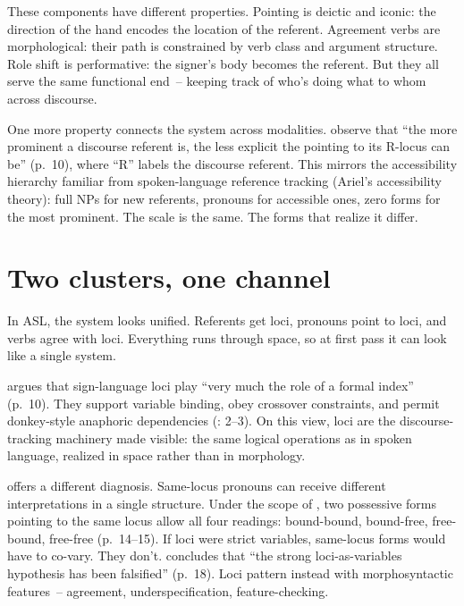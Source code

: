 These components have different properties. Pointing is deictic and iconic: the direction of the hand encodes the location of the referent. Agreement verbs are morphological: their path is constrained by verb class and argument structure. Role shift is performative: the signer's body becomes the referent. But they all serve the same functional end~-- keeping track of who's doing what to whom across discourse.

One more property connects the system across modalities. \textcite{steinbach2016} observe that \enquote{the more prominent a discourse referent is, the less explicit the pointing to its R-locus can be} (p.~10), where \enquote{R} labels the discourse referent. This mirrors the accessibility hierarchy familiar from spoken-language reference tracking (\eg Ariel's accessibility theory): full NPs for new referents, pronouns for accessible ones, zero forms for the most prominent. The scale is the same. The forms that realize it differ.


\section{Two clusters, one channel}
\label{sec:sign:two-clusters}

In ASL, the system looks unified. Referents get loci, pronouns point to loci, and verbs agree with loci. Everything runs through space, so at first pass it can look like a single system.

\textcite{schlenker2017} argues that sign-language loci play \enquote{very much the role of a formal index} (p.~10). They support variable binding, obey crossover constraints, and permit donkey-style anaphoric dependencies (\citealt{zucchi2012}: 2--3). On this view, loci are the discourse-tracking machinery made visible: the same logical operations as in spoken language, realized in space rather than in morphology.

\textcite{kuhn2016} offers a different diagnosis. Same-locus pronouns can receive different interpretations in a single structure. Under the scope of , two possessive forms pointing to the same locus allow all four readings: bound-bound, bound-free, free-bound, free-free (p.~14--15). If loci were strict variables, same-locus forms would have to co-vary. They don't. \textcite{kuhn2016} concludes that \enquote{the strong loci-as-variables hypothesis has been falsified} (p.~18). Loci pattern instead with morphosyntactic features~-- agreement, underspecification, feature-checking.

